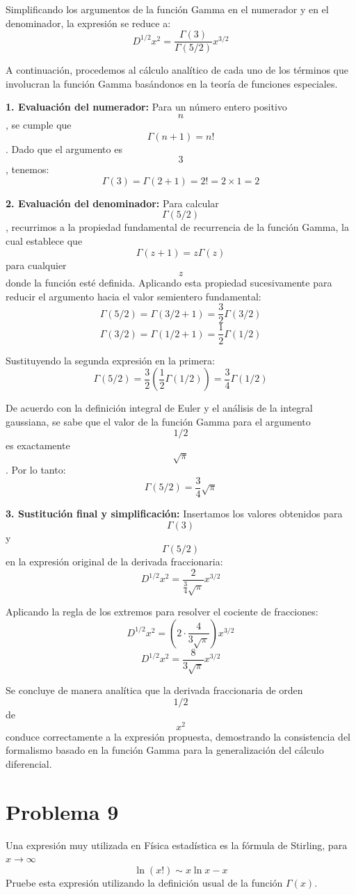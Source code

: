 \documentclass[a4paper]{article}
\begin{document}
Simplificando los argumentos de la función Gamma en el numerador y en el denominador, la expresión se reduce a:
$$D^{1/2}x^2 = \frac{\Gamma(3)}{\Gamma(5/2)} x^{3/2}$$

A continuación, procedemos al cálculo analítico de cada uno de los términos que involucran la función Gamma basándonos en la teoría de funciones especiales.

\textbf{1. Evaluación del numerador:}
Para un número entero positivo $$n$$, se cumple que $$\Gamma(n+1) = n!$$. Dado que el argumento es $$3$$, tenemos:
$$\Gamma(3) = \Gamma(2+1) = 2! = 2 \times 1 = 2$$

\textbf{2. Evaluación del denominador:}
Para calcular $$\Gamma(5/2)$$, recurrimos a la propiedad fundamental de recurrencia de la función Gamma, la cual establece que $$\Gamma(z+1) = z\Gamma(z)$$ para cualquier $$z$$ donde la función esté definida. Aplicando esta propiedad sucesivamente para reducir el argumento hacia el valor semientero fundamental:
$$\Gamma(5/2) = \Gamma(3/2 + 1) = \frac{3}{2} \Gamma(3/2)$$
$$\Gamma(3/2) = \Gamma(1/2 + 1) = \frac{1}{2} \Gamma(1/2)$$

Sustituyendo la segunda expresión en la primera:
$$\Gamma(5/2) = \frac{3}{2} \left( \frac{1}{2} \Gamma(1/2) \right) = \frac{3}{4} \Gamma(1/2)$$

De acuerdo con la definición integral de Euler y el análisis de la integral gaussiana, se sabe que el valor de la función Gamma para el argumento $$1/2$$ es exactamente $$\sqrt{\pi}$$. Por lo tanto:
$$\Gamma(5/2) = \frac{3}{4} \sqrt{\pi}$$

\textbf{3. Sustitución final y simplificación:}
Insertamos los valores obtenidos para $$\Gamma(3)$$ y $$\Gamma(5/2)$$ en la expresión original de la derivada fraccionaria:
$$D^{1/2}x^2 = \frac{2}{\frac{3}{4}\sqrt{\pi}} x^{3/2}$$

Aplicando la regla de los extremos para resolver el cociente de fracciones:
$$D^{1/2}x^2 = \left( 2 \cdot \frac{4}{3\sqrt{\pi}} \right) x^{3/2}$$
$$D^{1/2}x^2 = \frac{8}{3\sqrt{\pi}} x^{3/2}$$

Se concluye de manera analítica que la derivada fraccionaria de orden $$1/2$$ de $$x^2$$ conduce correctamente a la expresión propuesta, demostrando la consistencia del formalismo basado en la función Gamma para la generalización del cálculo diferencial.


\section{Problema 9}
Una expresión muy utilizada en Física estadística es la fórmula de Stirling, para $x \to \infty$
$$ \ln(x!) \sim x \ln x - x $$
Pruebe esta expresión utilizando la definición usual de la función $\Gamma(x).$
\end{document}
